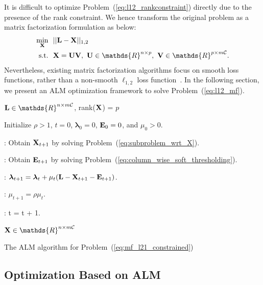 \documentclass[10pt,twocolumn,letterpaper]{article}
\def\bE{{\bf E}}
\def\blambda{{\bm \lambda}}
\def\calC{{\mathcal{C}}}
\def\bL{{\bf L}}
\def\bU{{\bf U}}
\def\bV{{\bf V}}
\def\dsR{\mathds{R}}
\def\bX{{\bf X}}
\def\bX{{\bf X}}
\def\st{{\text{s.t.}}}
\begin{document}
It is difficult to optimize Problem~(\ref{eq:l12_rankconstraint}) directly due to the presence of the rank constraint.
We hence transform the original problem as a matrix factorization formulation as below:
{\small
\begin{align}\label{eq:l12_mf}
  \min_{\bX} ~&~ || \bL - \bX ||_{1,2}   \nonumber \\
         \st ~&~ \bX = \bU \bV,~\bU \in \dsR^{n \times p},~\bV \in \dsR^{p \times m\calC}  .
\end{align}
}
\noindent
Nevertheless, existing matrix factorization algorithms focus on smooth loss functions, rather than a non-smooth $\ell_{1,2}$ loss function~\cite{tanicml2014riemannian,vandereycken2013lowrank,Wen2012,ngonips2012scaled,rtrmc2011boumal}.
In the following section, we present an ALM optimization framework to solve Problem~(\ref{eq:l12_mf}).


\begin{algorithm}[ht]

\begin{algorithmic}

\REQUIRE $\bL \in \dsR^{n \times m\calC}$, rank($\bX$) = $p$

\STATE Initialize $\rho > 1$, $t = 0$, $\blambda_{0} = 0$, $\bE_{0} = 0$, and $\mu_{0} > 0$.

\WHILE{$t = 0$ or $L_1(\bE_{t+1}-\bE_{t}) \geq \epsilon$}


    : Obtain $\bX_{t+1}$ by solving Problem~(\ref{eq:subproblem_wrt_X}).

    : Obtain $\bE_{t+1}$ by solving Problem~(\ref{eq:column_wise_soft_thresholding}).

  \ENDWHILE

  : $\blambda_{t+1} = \blambda_{t} + \mu_{t} (\bL - \bX_{t+1} - \bE_{t+1})$.

  : $\mu_{t+1} = \rho \mu_{t}$.

  : t = t + 1.

\ENDWHILE

\ENSURE $\bX \in \dsR^{n \times m\calC}$

\end{algorithmic}
\caption{The ALM algorithm for Problem~(\ref{eq:mf_l21_constrained})}
\label{alg:alm_mf}
\end{algorithm}


\subsection{Optimization Based on ALM}
\end{document}
